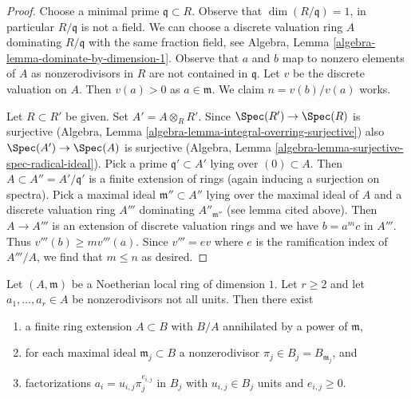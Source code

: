 \begin{proof}
Choose a minimal prime $\mathfrak q \subset R$. Observe that
$\dim(R/\mathfrak q) = 1$, in particular $R/\mathfrak q$ is not a field.
We can choose a discrete valuation ring $A$ dominating $R/\mathfrak q$
with the same fraction field, see
Algebra, Lemma \ref{algebra-lemma-dominate-by-dimension-1}. Observe that
$a$ and $b$ map to nonzero elements of $A$ as nonzerodivisors in $R$
are not contained in $\mathfrak q$. Let $v$ be the discrete valuation on $A$.
Then $v(a) > 0$ as $a \in \mathfrak m$.
We claim $n = v(b)/v(a)$ works.

\medskip\noindent
Let $R \subset R'$ be given. Set $A' = A \otimes_R R'$.
Since $\Spec(R') \to \Spec(R)$ is surjective
(Algebra, Lemma \ref{algebra-lemma-integral-overring-surjective})
also $\Spec(A') \to \Spec(A)$ is surjective
(Algebra, Lemma \ref{algebra-lemma-surjective-spec-radical-ideal}).
Pick a prime $\mathfrak q' \subset A'$ lying over $(0) \subset A$.
Then $A \subset A'' = A'/\mathfrak q'$ is a finite extension of rings
(again inducing a surjection on spectra).
Pick a maximal ideal $\mathfrak m'' \subset A''$
lying over the maximal ideal of $A$ and a discrete valuation ring
$A'''$ dominating $A''_{\mathfrak m''}$ (see lemma cited above).
Then $A \to A'''$ is an extension of discrete valuation rings
and we have $b = a^m c$ in $A'''$. Thus $v'''(b) \geq mv'''(a)$.
Since $v''' = ev$ where $e$ is the ramification index
of $A'''/A$, we find that $m \leq n$ as desired.
\end{proof}

\begin{lemma}
\label{lemma-prepare-tame-symbol}
Let $(A, \mathfrak m)$ be a Noetherian local ring of dimension $1$.
Let $r \geq 2$ and let $a_1, \ldots, a_r \in A$ be nonzerodivisors
not all units.
Then there exist
\begin{enumerate}
\item a finite ring extension $A \subset B$ with
$B/A$ annihilated by a power of $\mathfrak m$,
\item for each maximal ideal $\mathfrak m_j \subset B$
a nonzerodivisor $\pi_j \in B_j = B_{\mathfrak m_j}$, and
\item factorizations $a_i = u_{i, j} \pi_j^{e_{i, j}}$ in $B_j$
with $u_{i, j} \in B_j$ units and $e_{i, j} \geq 0$.
\end{enumerate}
\end{lemma}

